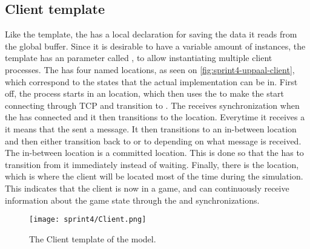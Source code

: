 \subsection{Client template}
Like the  template, the  has a local declaration for saving the data it reads from the global buffer.
Since it is desirable to have a variable amount of instances, the template has an  parameter called , to allow instantiating multiple client processes.
The  has four named locations, as seen on \autoref{fig:sprint4-uppaal-client}, which correspond to the states that the actual implementation can be in.
First off, the process starts in an  location, which then uses the  to make the  start connecting through TCP and transition to .
The  receives  synchronization when the  has connected and it then transitions to the  location.
Everytime it receives a  it means that the  sent a message.
It then transitions to an in-between location and then either transition back to  or to  depending on what message is received.
The in-between location is a committed location.
This is done so that the  has to transition from it immediately instead of waiting.
Finally, there is the  location, which is where the client will be located most of the time during the simulation. 
This indicates that the client is now in a game, and can continuously receive information about the game state through the  and  synchronizations.
\begin{figure}[h]
    \centering
    \texttt{[image: sprint4/Client.png]}
    \caption{The Client template of the \uppaal model.}
    \label{fig:sprint4-uppaal-client}
\end{figure}

